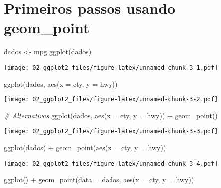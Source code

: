 \documentclass[
]{book}
\newenvironment{Shaded}{\begin{snugshade}}{\end{snugshade}}
\newcommand{\AttributeTok}[1]{\textcolor[rgb]{0.77,0.63,0.00}{#1}}
\newcommand{\CommentTok}[1]{\textcolor[rgb]{0.56,0.35,0.01}{\textit{#1}}}
\newcommand{\FunctionTok}[1]{\textcolor[rgb]{0.00,0.00,0.00}{#1}}
\newcommand{\NormalTok}[1]{#1}
\newcommand{\OtherTok}[1]{\textcolor[rgb]{0.56,0.35,0.01}{#1}}
\newcommand{\SpecialCharTok}[1]{\textcolor[rgb]{0.00,0.00,0.00}{#1}}
\begin{document}
\hypertarget{primeiros-passos-usando-geom_point}{%
\section{Primeiros passos usando geom\_point}\label{primeiros-passos-usando-geom_point}}

\begin{Shaded}
\begin{Highlighting}[]
\NormalTok{dados }\OtherTok{\textless{}{-}}\NormalTok{ mpg}
\FunctionTok{ggplot}\NormalTok{(dados)}
\end{Highlighting}
\end{Shaded}

\texttt{[image: 02\_ggplot2\_files/figure-latex/unnamed-chunk-3-1.pdf]}

\begin{Shaded}
\begin{Highlighting}[]
\FunctionTok{ggplot}\NormalTok{(dados, }\FunctionTok{aes}\NormalTok{(}\AttributeTok{x =}\NormalTok{ cty, }\AttributeTok{y =}\NormalTok{ hwy))}
\end{Highlighting}
\end{Shaded}

\texttt{[image: 02\_ggplot2\_files/figure-latex/unnamed-chunk-3-2.pdf]}

\begin{Shaded}
\begin{Highlighting}[]
\CommentTok{\# Alternativas}
\FunctionTok{ggplot}\NormalTok{(dados, }\FunctionTok{aes}\NormalTok{(}\AttributeTok{x =}\NormalTok{ cty, }\AttributeTok{y =}\NormalTok{ hwy)) }\SpecialCharTok{+} 
  \FunctionTok{geom\_point}\NormalTok{()}
\end{Highlighting}
\end{Shaded}

\texttt{[image: 02\_ggplot2\_files/figure-latex/unnamed-chunk-3-3.pdf]}

\begin{Shaded}
\begin{Highlighting}[]
\FunctionTok{ggplot}\NormalTok{(dados) }\SpecialCharTok{+} 
  \FunctionTok{geom\_point}\NormalTok{(}\FunctionTok{aes}\NormalTok{(}\AttributeTok{x =}\NormalTok{ cty, }\AttributeTok{y =}\NormalTok{ hwy))}
\end{Highlighting}
\end{Shaded}

\texttt{[image: 02\_ggplot2\_files/figure-latex/unnamed-chunk-3-4.pdf]}

\begin{Shaded}
\begin{Highlighting}[]
\FunctionTok{ggplot}\NormalTok{() }\SpecialCharTok{+} 
  \FunctionTok{geom\_point}\NormalTok{(}\AttributeTok{data =}\NormalTok{ dados, }\FunctionTok{aes}\NormalTok{(}\AttributeTok{x =}\NormalTok{ cty, }\AttributeTok{y =}\NormalTok{ hwy))}
\end{Highlighting}
\end{Shaded}
\end{document}
